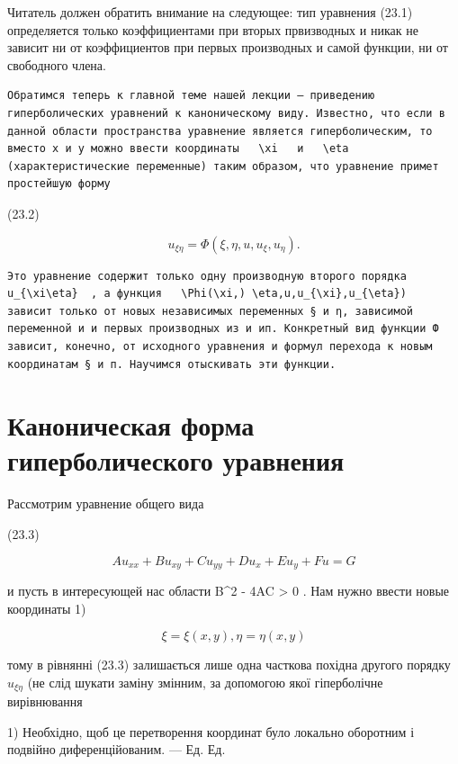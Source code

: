 \documentclass[
  ukrainian,
]{article}
\begin{document}
Читатель должен обратить внимание на следующее: тип уравнения (23.1)
определяется только коэффициентами при вторых првизводных и никак не
зависит ни от коэффициентов при первых производных и самой функции, ни
от свободного члена.

\begin{verbatim}
Обратимся теперь к главной теме нашей лекции — приведению гиперболических уравнений к каноническому виду. Известно, что если в данной области пространства уравнение является гиперболическим, то вместо x и y можно ввести координаты   \xi   и   \eta  (характеристические переменные) таким образом, что уравнение примет простейшую форму
\end{verbatim}

(23.2)

\[
u_{\xi\eta} = \Phi(\xi, \eta, u, u_{\xi}, u_{\eta}).
\]

\begin{verbatim}
Это уравнение содержит только одну производную второго порядка   u_{\xi\eta}  , а функция   \Phi(\xi,) \eta,u,u_{\xi},u_{\eta})   зависит только от новых независимых переменных § и η, зависимой переменной и и первых производных из и ип. Конкретный вид функции Ф зависит, конечно, от исходного уравнения и формул перехода к новым координатам § и п. Научимся отыскивать эти функции.
\end{verbatim}

\section{Каноническая форма гиперболического
уравнения}\label{ux43aux430ux43dux43eux43dux438ux447ux435ux441ux43aux430ux44f-ux444ux43eux440ux43cux430-ux433ux438ux43fux435ux440ux431ux43eux43bux438ux447ux435ux441ux43aux43eux433ux43e-ux443ux440ux430ux432ux43dux435ux43dux438ux44f}

Рассмотрим уравнение общего вида

(23.3)

\[
Au_{xx} + Bu_{xy} + Cu_{yy} + Du_x + Eu_y + Fu = G
\]

и пусть в интересующей нас области B\^{}2 - 4AC \textgreater{} 0 . Нам
нужно ввести новые координаты 1)

\[
\xi = \xi(x, y),
\eta = \eta(x, y)
\]

тому в рівнянні (23.3) залишається лише одна часткова похідна другого
порядку \(u_{\xi\eta}\) (не слід шукати заміну змінним, за допомогою
якої гіперболічне вирівнювання

1) Необхідно, щоб це перетворення координат було локально оборотним і
подвійно диференційованим. --- Ед. Ед.
\end{document}
